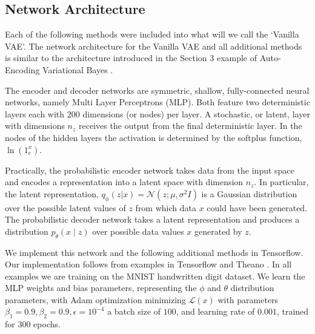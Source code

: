 \documentclass{article} %
\numberwithin{figure}{section}
\renewcommand{\L}{\mathcal{L}}
\begin{document}
\subsection{Network Architecture}
Each of the following methods were included into what will we call the `Vanilla VAE'. The network architecture for the Vanilla VAE and all additional methods is similar to the architecture introduced in the Section $3$ example of Auto-Encoding Variational Bayes \cite{Kingma2013}.
\par The encoder and decoder networks are symmetric, shallow, fully-connected neural networks, namely Multi Layer Perceptrons (MLP). Both feature two deterministic layers each with $200$ dimensions (or nodes) per layer. A stochastic, or latent, layer with dimensions $n_z$ receives the output from the final deterministic layer.  In the nodes of the hidden layers the activation is determined by the softplus function, $\ln{\left(1_e^x\right)}$.
\par Practically, the probabilistic encoder network takes data from the input space and encodes a representation into a latent space with dimension $n_z$. In particular, the latent representation, $q_\phi(z|x)=\mathcal{N}(z;\mu,\sigma^2 I)$ is a Gaussian distribution over the possible latent values of $z$ from which data $x$ could have been generated. The probabilistic decoder network takes a latent representation and produces a distribution ${p_\theta(x\mid z)}$ over possible data values $x$ generated by $z$.
\par We implement this network and the following additional methods in Tensorflow. Our implementation follows from examples in Tensorflow and Theano \cite{Sonderby2016,Metzen2015,Ahuja}. In all examples we are training on the MNIST handwritten digit dataset. We learn the MLP weights and bias parameters, representing the $\phi$ and $\theta$ distribution parameters, with Adam optimization minimizing $\L(x)$ with parameters $\beta_1 = 0.9, \beta_2 = 0.9, \epsilon = 10^{-4}$ a batch size of $100$, and learning rate of $0.001$, trained for $300$ epochs.
\end{document}
